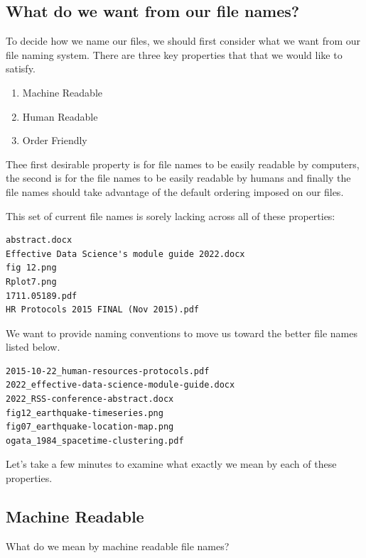 \documentclass[
  letterpaper,
  DIV=11,
  numbers=noendperiod]{scrreprt}
\providecommand{\tightlist}{%
  \setlength{\itemsep}{0pt}\setlength{\parskip}{0pt}}\usepackage{longtable,booktabs,array}
\begin{document}
\subsection{What do we want from our file
names?}\label{what-do-we-want-from-our-file-names}

To decide how we name our files, we should first consider what we want
from our file naming system. There are three key properties that that we
would like to satisfy.

\begin{enumerate}
\def\labelenumi{\arabic{enumi}.}
\tightlist
\item
  Machine Readable
\item
  Human Readable
\item
  Order Friendly
\end{enumerate}

Thee first desirable property is for file names to be easily readable by
computers, the second is for the file names to be easily readable by
humans and finally the file names should take advantage of the default
ordering imposed on our files.

This set of current file names is sorely lacking across all of these
properties:

\begin{verbatim}
abstract.docx
Effective Data Science's module guide 2022.docx 
fig 12.png
Rplot7.png
1711.05189.pdf
HR Protocols 2015 FINAL (Nov 2015).pdf
\end{verbatim}

We want to provide naming conventions to move us toward the better file
names listed below.

\begin{verbatim}
2015-10-22_human-resources-protocols.pdf
2022_effective-data-science-module-guide.docx
2022_RSS-conference-abstract.docx 
fig12_earthquake-timeseries.png 
fig07_earthquake-location-map.png
ogata_1984_spacetime-clustering.pdf
\end{verbatim}

Let's take a few minutes to examine what exactly we mean by each of
these properties.

\subsection{Machine Readable}\label{machine-readable}

What do we mean by machine readable file names?
\end{document}
